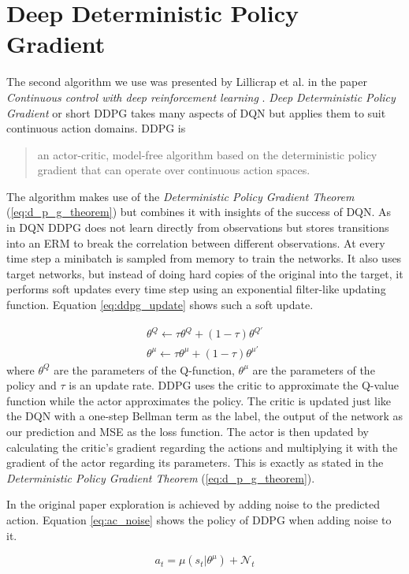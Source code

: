 \section{Deep Deterministic Policy Gradient}

The second algorithm we use was presented by Lillicrap et al. in the paper \emph{Continuous control with deep reinforcement learning} \cite{ddpg}.
\emph{Deep Deterministic Policy Gradient} or short DDPG takes many aspects of DQN but applies them to suit continuous action domains.
DDPG is \blockquote[{\cite[1]{ddpg}}]{an actor-critic, model-free algorithm based on the deterministic policy gradient that can operate over continuous action spaces.}
The algorithm makes use of the \emph{Deterministic Policy Gradient Theorem} (\ref{eq:d_p_g_theorem}) but combines it with insights of the success of DQN.
As in DQN DDPG does not learn directly from observations but stores transitions into an ERM to break the correlation between different observations.
At every time step a minibatch is sampled from memory to train the networks.
It also uses target networks, but instead of doing hard copies of the original into the target, it performs soft updates every time step using an exponential filter-like updating function.
Equation \ref{eq:ddpg_update} shows such a soft update.

\begin{align}
  \label{eq:ddpg_update}
  \theta^Q \leftarrow \tau \theta^Q + (1 - \tau) \theta^{Q'} \nonumber\\
  \theta^\mu \leftarrow \tau \theta^\mu + (1 - \tau) \theta^{\mu'}
\end{align}
where $\theta^Q$ are the parameters of the Q-function, $\theta^\mu$ are the parameters of the policy and $\tau$ is an update rate.
DDPG uses the critic to approximate the Q-value function while the actor approximates the policy.
The critic is updated just like the DQN with a one-step Bellman term as the label, the output of the network as our prediction and MSE as the loss function.
The actor is then updated by calculating the critic's gradient regarding the actions and multiplying it with the gradient of the actor regarding its parameters.
This is exactly as stated in the \emph{Deterministic Policy Gradient Theorem} (\ref{eq:d_p_g_theorem}).


In the original paper exploration is achieved by adding noise to the predicted action.
Equation \ref{eq:ac_noise} shows the policy of DDPG when adding noise to it.

\begin{equation}
  \label{eq:ac_noise}
  a_t = \mu(s_t | \theta^\mu) + \mathcal{N}_t
\end{equation}

